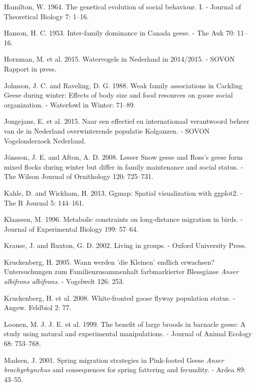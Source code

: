 \documentclass[10pt,twocolumn]{paper}
\begin{document}
\hypertarget{ref-HAMILTON19641}{}
Hamilton, W. 1964. The genetical evolution of social behaviour. I. -
Journal of Theoretical Biology 7: 1--16.

\hypertarget{ref-hanson1953dominance}{}
Hanson, H. C. 1953. Inter-family dominance in Canada geese. - The Auk
70: 11--16.

\hypertarget{ref-sovon2015watervogels}{}
Hornman, M. et al. 2015. Watervogels in Nederland in 2014/2015. - SOVON
Rapport in press.

\hypertarget{ref-johnson1988weak}{}
Johnson, J. C. and Raveling, D. G. 1988. Weak family associations in
Cackling Geese during winter: Effects of body size and food resources on
goose social organization. - Waterfowl in Winter: 71--89.

\hypertarget{ref-jongejans2015naar}{}
Jongejans, E. et al. 2015. Naar een effectief en internationaal
verantwoord beheer van de in Nederland overwinterende populatie
Kolganzen. - SOVON Vogelonderzoek Nederland.

\hypertarget{ref-jonsson2008lesser}{}
Jónsson, J. E. and Afton, A. D. 2008. Lesser Snow geese and Ross's geese
form mixed flocks during winter but differ in family maintenance and
social status. - The Wilson Journal of Ornithology 120: 725--731.

\hypertarget{ref-ggmap}{}
Kahle, D. and Wickham, H. 2013. Ggmap: Spatial visualization with
ggplot2. - The R Journal 5: 144--161.

\hypertarget{ref-Klaassen57}{}
Klaassen, M. 1996. Metabolic constraints on long-distance migration in
birds. - Journal of Experimental Biology 199: 57--64.

\hypertarget{ref-krause2002living}{}
Krause, J. and Ruxton, G. D. 2002. Living in groups. - Oxford University
Press.

\hypertarget{ref-kruckenberg2005young}{}
Kruckenberg, H. 2005. Wann werden 'die Kleinen' endlich erwachsen?
Untersuchungen zum Familienzusammenhalt farbmarkierter Blessgänse
\emph{Anser albifrons albifrons}. - Vogelwelt 126: 253.

\hypertarget{ref-kruckenberg2008white}{}
Kruckenberg, H. et al. 2008. White-fronted goose flyway population
status. - Angew. Feldbiol 2: 77.

\hypertarget{ref-JANE:JANE325}{}
Loonen, M. J. J. E. et al. 1999. The benefit of large broods in barnacle
geese: A study using natural and experimental manipulations. - Journal
of Animal Ecology 68: 753--768.

\hypertarget{ref-madsen2001spring}{}
Madsen, J. 2001. Spring migration strategies in Pink-footed Geese
\emph{Anser brachyrhynchus} and consequences for spring fattering and
fecundity. - Ardea 89: 43--55.
\end{document}
